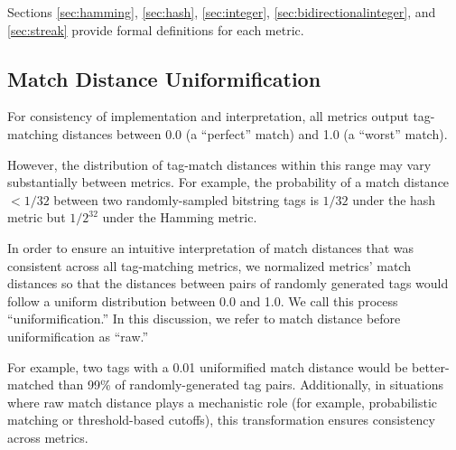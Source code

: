 
Sections \ref{sec:hamming}, \ref{sec:hash}, \ref{sec:integer}, \ref{sec:bidirectionalinteger}, and \ref{sec:streak} provide formal definitions for each metric.







\subsection{Match Distance Uniformification}
\label{sec:uniformification}



For consistency of implementation and interpretation, all metrics output tag-matching distances between 0.0 (a ``perfect'' match) and 1.0 (a ``worst'' match).

However, the distribution of tag-match distances within this range may vary substantially between metrics.
For example, the probability of a match distance $<1/32$ between two randomly-sampled bitstring tags is $1/32$ under the hash metric but $1/2^{32}$ under the Hamming metric.

In order to ensure an intuitive interpretation of match distances that was consistent across all tag-matching metrics, we normalized metrics' match distances so that the distances between pairs of randomly generated tags would follow a uniform distribution between 0.0 and 1.0.
We call this process ``uniformification.''
In this discussion, we refer to match distance before uniformification as ``raw.''

For example, two tags with a 0.01 uniformified match distance would be better-matched than 99\% of randomly-generated tag pairs.
Additionally, in situations where raw match distance plays a mechanistic role (for example, probabilistic matching or threshold-based cutoffs), this transformation ensures consistency across metrics.

